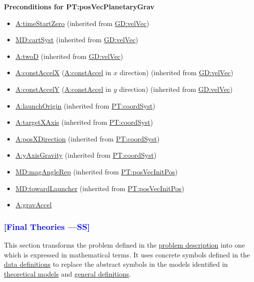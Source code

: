 \documentclass[12pt]{article}
\newcommand{\authornote}[3]{\textcolor{#1}{[#3 ---#2]}}
\newcommand{\authornote}[3]{}
\newcommand{\wss}[1]{\authornote{blue}{SS}{#1}}
\begin{document}
\noindent \textbf{Preconditions for PT:posVecPlanetaryGrav} 
\begin{itemize} 
\item \hyperref[timeStartZero]{A:timeStartZero} (inherited from
\hyperref[GD:velVec]{GD:velVec}) 
\item \hyperref[MD:cartSyst]{MD:cartSyst} (inherited from
\hyperref[GD:velVec]{GD:velVec}) 
\item \hyperref[twoD]{A:twoD} (inherited from \hyperref[GD:velVec]{GD:velVec}) 
\item \hyperref[constAccelX]{A:constAccelX} (\hyperref[constAccel]{A:constAccel}
in $x$ direction) (inherited from \hyperref[GD:velVec]{GD:velVec}) 
\item \hyperref[constAccelY]{A:constAccelY} (\hyperref[constAccel]{A:constAccel}
in $y$ direction) (inherited from \hyperref[GD:velVec]{GD:velVec}) 
\item \hyperref[launchOrigin]{A:launchOrigin} (inherited from
\hyperref[PT:coordSyst]{PT:coordSyst}) 
\item \hyperref[targetXAxis]{A:targetXAxis} (inherited from
\hyperref[PT:coordSyst]{PT:coordSyst}) 
\item \hyperref[posXDirection]{A:posXDirection} (inherited from
\hyperref[PT:coordSyst]{PT:coordSyst}) 
\item \hyperref[yAxisGravity]{A:yAxisGravity} (inherited from
\hyperref[PT:coordSyst]{PT:coordSyst}) 
\item \hyperref[MD:magAngleRep]{MD:magAngleRep} (inherited from \hyperref[PT:posVecInitPos]{PT:posVecInitPos})
\item \hyperref[MD:towardLauncher]{MD:towardLauncher} (inherited from \hyperref[PT:posVecInitPos]{PT:posVecInitPos})
\item \hyperref[gravAccel]{A:gravAccel}
\end{itemize}

\subsubsection{\wss{Final Theories}} \label{Sec:IMs} This section transforms the
problem defined in the \hyperref[Sec:ProbDesc]{problem description} into one
which is expressed in mathematical terms. It uses concrete symbols defined in
the \hyperref[Sec:DDs]{data definitions} to replace the abstract symbols in the
models identified in \hyperref[Sec:TMs]{theoretical models} and
\hyperref[Sec:GDs]{general definitions}.
\end{document}
